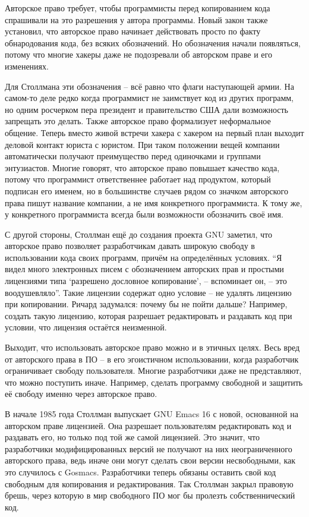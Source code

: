 Авторское право требует, чтобы программисты перед копированием кода спрашивали на это разрешения у автора программы. Новый закон также установил, что авторское право начинает действовать просто по факту обнародования кода, без всяких обозначений. Но обозначения начали появляться, потому что многие хакеры даже не подозревали об авторском праве и его изменениях.

Для Столлмана эти обозначения -- всё равно что флаги наступающей армии. На самом-то деле редко когда программист не заимствует код из других программ, но одним росчерком пера президент и правительство США дали возможность запрещать это делать. Также авторское право формализует неформальное общение. Теперь вместо живой встречи хакера с хакером на первый план выходит деловой контакт юриста с юристом. При таком положении вещей компании автоматически получают преимущество перед одиночками и группами энтузиастов. Многие говорят, что авторское право повышает качество кода, потому что программист ответственнее работает над продуктом, который подписан его именем, но в большинстве случаев рядом со значком авторского права пишут название компании, а не имя конкретного программиста. К тому же, у конкретного программиста всегда были возможности обозначить своё имя.

С другой стороны, Столлман ещё до создания проекта GNU заметил, что авторское право позволяет разработчикам давать широкую свободу в использовании кода своих программ, причём на определённых условиях. \enquote{Я видел много электронных писем с обозначением авторских прав и простыми лицензиями типа \enquote{разрешено дословное копирование}, -- вспоминает он, -- это воодушевляло}. Такие лицензии содержат одно условие -- не удалять лицензию при копировании. Ричард задумался: почему бы не пойти дальше? Например, создать такую лицензию, которая разрешает редактировать и раздавать код при условии, что лицензия остаётся неизменной.

Выходит, что использовать авторское право можно и в этичных целях. Весь вред от авторского права в ПО -- в его эгоистичном использовании, когда разработчик ограничивает свободу пользователя. Многие разработчики даже не представляют, что можно поступить иначе. Например, сделать программу свободной и защитить её свободу именно через авторское право.

В начале 1985 года Столлман выпускает GNU Emacs 16 с новой, основанной на авторском праве лицензией. Она разрешает пользователям редактировать код и раздавать его, но только под той же самой лицензией. Это значит,  что разработчики модифицированных версий не получают на них неограниченного авторского права, ведь иначе они могут сделать свои версии несвободными, как это случилось с Gosmacs. Разработчики теперь обязаны оставить свой код свободным для копирования и редактирования. Так Столлман закрыл правовую брешь, через которую в мир свободного ПО мог бы пролезть собственнический код.

